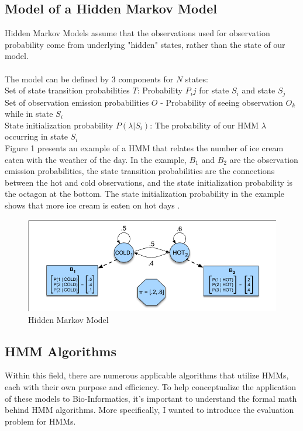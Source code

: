 \documentclass[12pt,journal,compsoc]{IEEEtran}
\begin{document}
\subsection{Model of a Hidden Markov Model}
Hidden Markov Models assume that the observations used for observation probability come from underlying "hidden" states, rather than the state of our model. \\ \\
The model can be defined by 3 components for $N$ states: \\
Set of state transition probabilities $T$: Probability $P_ij$ for state $S_i$ and state $S_j$ \\
Set of observation emission probabilities $O$ - Probability of seeing observation $O_k$ while in state $S_i$ \\
State initialization probability $P(\lambda | S_i)$: The probability of our HMM $\lambda$ occurring in state $S_i$ \\

Figure 1 presents an example of a HMM that relates the number of ice cream eaten with the weather of the day. In the example, $B_1$ and $B_2$ are the observation emission probabilities, the state transition probabilities are the connections between the hot and cold observations, and the state initialization probability is the octagon at the bottom. The state initialization probability in the example shows that more ice cream is eaten on hot days \cite{Standford_HMM_Notes}.
\begin{figure}[H]
    \centering
    \includegraphics[width=\linewidth]{images/Screenshot 2022-06-07 at 18-31-01 A.pdf.png}
    \caption{Hidden Markov Model}
    \label{fig:Hidden Markov Model}
\end{figure}


\subsection{HMM Algorithms}
Within this field, there are numerous applicable algorithms that utilize HMMs, each with their own purpose and efficiency. To help conceptualize the application of these models to Bio-Informatics, it's important to understand the formal math behind HMM algorithms. More specifically, I wanted to introduce the evaluation problem for HMMs.
\end{document}

